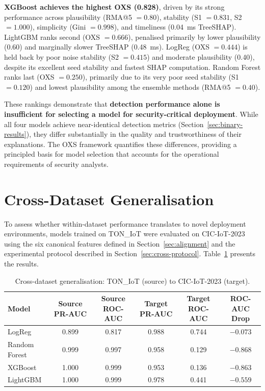 \documentclass[12pt,a4paper]{report}
\begin{document}
\textbf{XGBoost achieves the highest OXS (0.828)}, driven by its strong performance across plausibility (RMA@5 $= 0.80$), stability (S1 $= 0.831$, S2 $= 1.000$), simplicity (Gini $= 0.998$), and timeliness (0.04~ms TreeSHAP). LightGBM ranks second (OXS $= 0.666$), penalised primarily by lower plausibility (0.60) and marginally slower TreeSHAP (0.48~ms). LogReg (OXS $= 0.444$) is held back by poor noise stability (S2 $= 0.415$) and moderate plausibility (0.40), despite its excellent seed stability and fastest SHAP computation. Random Forest ranks last (OXS $= 0.250$), primarily due to its very poor seed stability (S1 $= 0.120$) and lowest plausibility among the ensemble methods (RMA@5 $= 0.40$).

These rankings demonstrate that \textbf{detection performance alone is insufficient for selecting a model for security-critical deployment}. While all four models achieve near-identical detection metrics (Section~\ref{sec:binary-results}), they differ substantially in the quality and trustworthiness of their explanations. The OXS framework quantifies these differences, providing a principled basis for model selection that accounts for the operational requirements of security analysts.

\section{Cross-Dataset Generalisation}
\label{sec:cross-results}

To assess whether within-dataset performance translates to novel deployment environments, models trained on TON\_IoT were evaluated on CIC-IoT-2023 \citep{cic2023} using the six canonical features defined in Section~\ref{sec:alignment} and the experimental protocol described in Section~\ref{sec:cross-protocol}. Table~\ref{tab:cross} presents the results.

\begin{table}[H]
\centering
\caption{Cross-dataset generalisation: TON\_IoT (source) to CIC-IoT-2023 (target).}
\label{tab:cross}
\begin{tabular}{lccccc}
\toprule
\textbf{Model} & \textbf{Source PR-AUC} & \textbf{Source ROC-AUC} & \textbf{Target PR-AUC} & \textbf{Target ROC-AUC} & \textbf{ROC-AUC Drop} \\
\midrule
LogReg & 0.899 & 0.817 & 0.988 & 0.744 & $-0.073$ \\
Random Forest & 0.999 & 0.997 & 0.958 & 0.129 & $-0.868$ \\
XGBoost & 1.000 & 0.999 & 0.953 & 0.136 & $-0.863$ \\
LightGBM & 1.000 & 0.999 & 0.978 & 0.441 & $-0.559$ \\
\bottomrule
\end{tabular}
\end{table}
\end{document}
